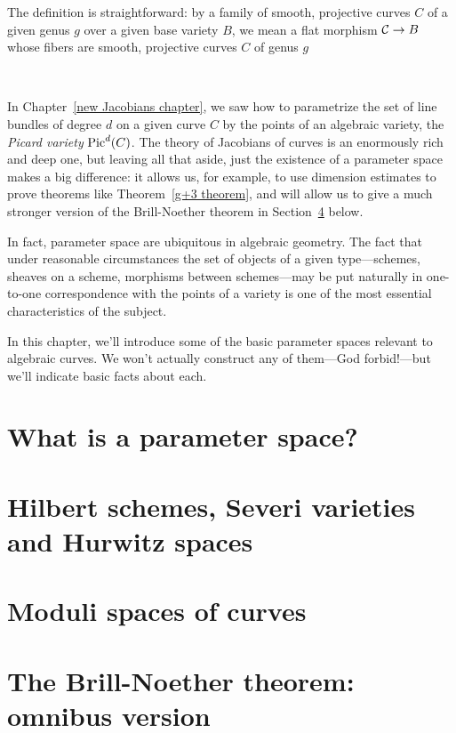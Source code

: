 The definition is straightforward: by a family of smooth, projective curves $C$ of a given genus $g$ over a given base variety $B$, we mean a flat morphism
$\cC \to B$ whose fibers are smooth, projective curves $C$ of genus $g$

\

In Chapter~\ref{new Jacobians chapter}, we saw how to parametrize the set of line bundles of degree $d$ on a given curve $C$ by the points of an algebraic variety, the \emph{Picard variety} $\Pic^d(C)$. The theory of  Jacobians of curves is an enormously rich and deep one, but leaving all that aside, just the existence of a parameter space makes a big difference: it allows us, for example, to use dimension estimates to prove theorems like Theorem~\ref{g+3 theorem}, and will allow us to give a much stronger version of the Brill-Noether theorem in Section~\ref{BNomnibus} below.

In fact, parameter space are ubiquitous in algebraic geometry. The fact that under reasonable circumstances the set of objects of a given type---schemes, sheaves on a scheme, morphisms between schemes---may be put naturally in one-to-one correspondence with the points of a variety is one of the most essential characteristics of the subject.

In this chapter, we'll introduce some of the basic parameter spaces relevant to algebraic curves. We won't actually construct any of them---God forbid!---but we'll indicate basic facts about each.

\section{What is a parameter space?}

\section{Hilbert schemes, Severi varieties and Hurwitz spaces}

\section{Moduli spaces of curves}

\section{The Brill-Noether theorem: omnibus version}\label{BNomnibus}


